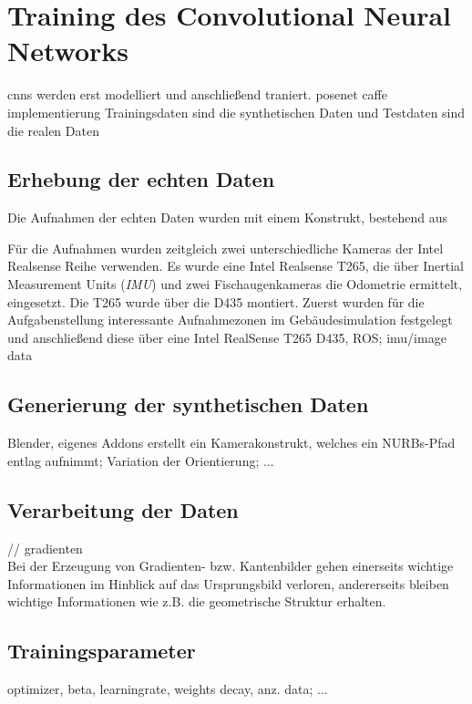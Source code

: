 
\section{Training des Convolutional Neural Networks}
cnns werden erst modelliert und anschließend traniert.
posenet caffe implementierung
Trainingsdaten sind die synthetischen Daten und Testdaten sind die realen Daten

\subsection{Erhebung der echten Daten}

Die Aufnahmen der echten Daten wurden mit einem Konstrukt, bestehend aus 

Für die Aufnahmen wurden zeitgleich zwei unterschiedliche Kameras der Intel Realsense Reihe verwenden. Es wurde eine Intel Realsense T265, die über Inertial Measurement Units (\textit{IMU}) und zwei Fischaugenkameras die Odometrie ermittelt, eingesetzt. Die T265 wurde über die D435 montiert.
Zuerst wurden für die Aufgabenstellung interessante Aufnahmezonen im Gebäudesimulation festgelegt und anschließend diese über eine
Intel RealSense T265 D435, ROS; imu/image data


\subsection{Generierung der synthetischen Daten}
Blender,
eigenes Addons erstellt ein Kamerakonstrukt, welches ein NURBs-Pfad entlag aufnimmt; Variation der Orientierung; ...

\subsection{Verarbeitung der Daten}
// gradienten\\
Bei der Erzeugung von Gradienten- bzw. Kantenbilder gehen einerseits wichtige Informationen im Hinblick auf das Ursprungsbild verloren, andererseits bleiben wichtige Informationen wie z.B. die geometrische Struktur erhalten.

\subsection{Trainingsparameter}
optimizer, beta,
learningrate,
weights decay, anz. data; ...